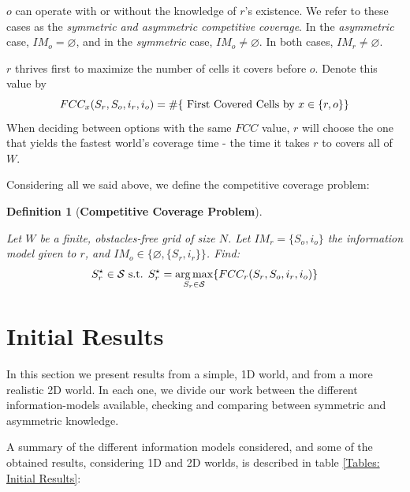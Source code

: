 \documentclass[a4paper,english,10pt]{article}
\newcommand\rob{\ensuremath{r}\xspace}
\newcommand\opp{\ensuremath{o}\xspace}
\newcommand{\w}{\ensuremath{W}\xspace}
\newcommand{\fcc}{\ensuremath{FCC}\xspace}
\DeclareMathOperator*{\argmax}{arg\,max} %
\newtheorem{definition}{Definition}
\begin{document}
\opp can operate with or without the knowledge of \rob's existence. We refer to these cases as the {\em symmetric and asymmetric competitive coverage}.
In the {\em asymmetric} case, $IM_\opp=\varnothing$, and in the {\em symmetric} case, $IM_\opp \neq \varnothing$. In both cases, $IM_\rob \neq \varnothing $.

\rob thrives first to maximize the number of cells it covers before \opp. Denote this value by  
\[
\fcc_{x}(S_\rob, S_\opp, i_\rob, i_\opp )=
\# \lbrace \textnormal{ First Covered Cells by } x \in \lbrace\rob,\opp\rbrace \rbrace 
\]
When deciding between options with the same \fcc value, \rob will choose the one that yields the fastest world's coverage time - the time it takes \rob to covers all of \w.

Considering all we said above, we define the competitive coverage problem:

\begin{definition}[\textbf{Competitive Coverage Problem}]
\begin{mdframed}[backgroundcolor=gray!20] 
Let \w be a finite, obstacles-free grid of size $N$. Let $IM_\rob=\lbrace S_\opp ,i_\opp \rbrace$ the information model given to \rob, and $IM_\opp \in \lbrace \varnothing, \lbrace S_\rob, i_\rob \rbrace \rbrace$. Find: \[ S_\rob^\star \in \mathcal{S} \textnormal{ s.t. } S_\rob^\star =\argmax_{S_\rob\in\mathcal{S}} \lbrace \fcc_{r}(S_\rob, S_\opp, i_\rob, i_\opp ) \rbrace\]
\end{mdframed}
\end{definition}


\section{Initial Results}
In this section we present results from a simple, 1D world, and from a more realistic 2D world. In each one, we divide our work between the different information-models available, checking and comparing between symmetric and asymmetric knowledge.

A summary of the different information models considered, and some of the obtained results, considering 1D and 2D worlds, is described in table \ref{Tables: Initial Results}:
  
\end{document}
